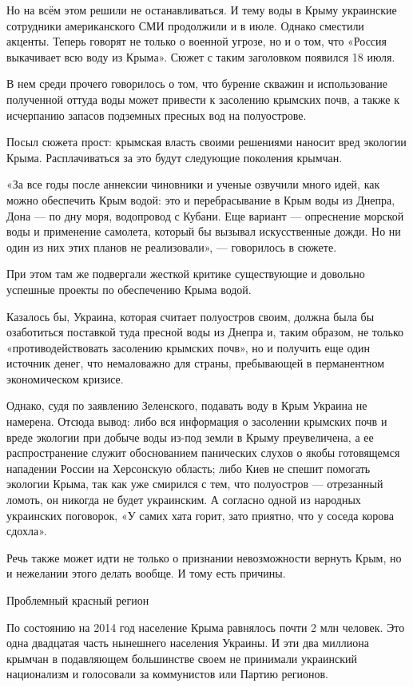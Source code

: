 Но на всём этом решили не останавливаться. И тему воды в Крыму украинские сотрудники американского СМИ продолжили и в июле. Однако сместили акценты. Теперь говорят не только о военной угрозе, но и о том, что «Россия выкачивает всю воду из Крыма». Сюжет с таким заголовком появился 18 июля.

В нем среди прочего говорилось о том, что бурение скважин и использование полученной оттуда воды может привести к засолению крымских почв, а также к исчерпанию запасов подземных пресных вод на полуострове.

Посыл сюжета прост: крымская власть своими решениями наносит вред экологии Крыма. Расплачиваться за это будут следующие поколения крымчан.

«За все годы после аннексии чиновники и ученые озвучили много идей, как можно обеспечить Крым водой: это и перебрасывание в Крым воды из Днепра, Дона — по дну моря, водопровод с Кубани. Еще вариант — опреснение морской воды и применение самолета, который бы вызывал искусственные дожди. Но ни один из них этих планов не реализовали», — говорилось в сюжете.

При этом там же подвергали жесткой критике существующие и довольно успешные проекты по обеспечению Крыма водой.

Казалось бы, Украина, которая считает полуостров своим, должна была бы озаботиться поставкой туда пресной воды из Днепра и, таким образом, не только «противодействовать засолению крымских почв», но и получить еще один источник денег, что немаловажно для страны, пребывающей в перманентном экономическом кризисе.

Однако, судя по заявлению Зеленского, подавать воду в Крым Украина не намерена. Отсюда вывод: либо вся информация о засолении крымских почв и вреде экологии при добыче воды из-под земли в Крыму преувеличена, а ее распространение служит обоснованием панических слухов о якобы готовящемся нападении России на Херсонскую область; либо Киев не спешит помогать экологии Крыма, так как уже смирился с тем, что полуостров — отрезанный ломоть, он никогда не будет украинским. А согласно одной из народных украинских поговорок, «У самих хата горит, зато приятно, что у соседа корова сдохла».

Речь также может идти не только о признании невозможности вернуть Крым, но и нежелании этого делать вообще. И тому есть причины.

Проблемный красный регион

По состоянию на 2014 год население Крыма равнялось почти 2 млн человек. Это одна двадцатая часть нынешнего населения Украины. И эти два миллиона крымчан в подавляющем большинстве своем не принимали украинский национализм и голосовали за коммунистов или Партию регионов.

